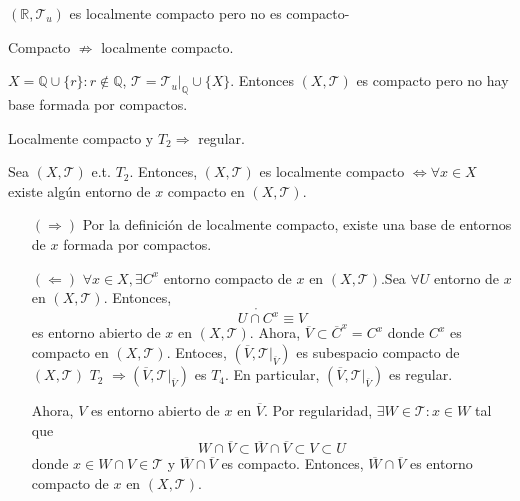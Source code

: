 \begin{ejm}
  $( \mathbb{R}, \mathcal{T}_{u} )$ es localmente compacto pero no es compacto-
\end{ejm}

\begin{obs}
  Compacto $\not \Rightarrow$ localmente compacto.
\end{obs}

\begin{ejm}
  $X = \mathbb{Q} \cup \{ r \} : r \not \in \mathbb{Q}$, $\mathcal{T} = \mathcal{T}_{u}|_{\mathbb{Q}} \cup \{ X \}$. Entonces $( X, \mathcal{T} )$ es compacto pero no hay base formada por compactos.
\end{ejm}

\begin{obs}
  Localmente compacto y $T_{2} \Rightarrow$ regular.
\end{obs}

\begin{prop}
  Sea $( X, \mathcal{T} )$ e.t. $T_{2}$. Entonces, $( X, \mathcal{T} )$ es localmente compacto $\Leftrightarrow \forall x \in X$ existe algún entorno de $x$ compacto en $( X, \mathcal{T} )$.
\end{prop}

\begin{dem}
  \begin{enumerate}[label=(\roman*)]
    \item []
    \item [$(\Rightarrow)$] Por la definición de localmente compacto, existe una base de entornos de $x$ formada por compactos.
    \item [$(\Leftarrow)$] $\forall x \in X, \exists C^{x}$ entorno compacto de $x$ en $( X, \mathcal{T} )$.Sea $\forall U$ entorno de $x$ en $( X, \mathcal{T} )$. Entonces,
      \[ 
        \mathring{U \cap C^{x}} \equiv V 
      \] 
      es entorno abierto de $x$ en $( X, \mathcal{T} )$. Ahora, $\overline{V} \subset \overline{C}^{x} = C^{x}$ donde $C^{x}$ es compacto en $( X, \mathcal{T} )$. Entoces, $( \overline{V}, \mathcal{T}|_{\overline{V}})$ es subespacio compacto de $( X, \mathcal{T} )$ $T_{2}$ $\Rightarrow ( \overline{V}, \mathcal{T}|_{\overline{V}})$ es $T_{4}$. En particular, $ ( \overline{V}, \mathcal{T}|_{\overline{V}})$ es regular.

      Ahora, $V$ es entorno abierto de $x$ en $\overline{V}$. Por regularidad, $\exists W \in \mathcal{T} : x \in W$ tal que
      \[ 
        W \cap \overline{V} \subset \overline{W} \cap \overline{V} \subset V \subset U 
      \] 
      donde $x \in W \cap V \in \mathcal{T}$ y $\overline{W} \cap \overline{V}$ es compacto. Entonces, $\overline{W} \cap \overline{V}$ es entorno compacto de $x$ en $( X, \mathcal{T} )$.
  \end{enumerate}
\end{dem}

